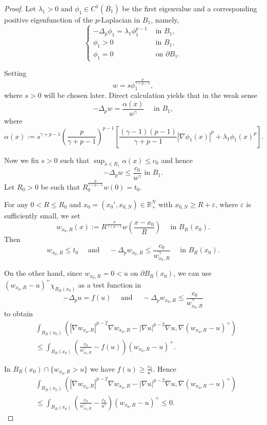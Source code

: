 \documentclass[10pt,a4paper]{amsart}
\begin{document}
	\begin{proof}
		Let $\lambda_1>0$ and $\phi_1 \in C^1(\overline{B_1})$ be the first eigenvalue and a corresponding positive eigenfunction of the $p$-Laplacian in $B_1$, namely,
		\[
		\begin{cases}
			-\Delta_p \phi_1 = \lambda_1 \phi_1^{p-1} & \text{ in } B_1,\\
			\phi_1 > 0 & \text{ in } B_1,\\
			\phi_1 = 0 & \text{ on } \partial B_1.
		\end{cases}
		\]
		
		Setting
		\[
		w = s \phi_1^\frac{p}{\gamma+p-1},
		\]
		where $s>0$ will be chosen later. Direct calculation yields that in the weak sense
		\[
		-\Delta_p w = \frac{\alpha(x)}{w^\gamma} \quad \text{ in } B_1,
		\]
		where
		\[
		\alpha(x) := s^{\gamma+p-1} \left(\frac{p}{\gamma+p-1}\right)^{p-1} \left[\frac{(\gamma-1)(p-1)}{\gamma+p-1}|\nabla\phi_1(x)|^p + \lambda_1\phi_1(x)^p\right].
		\]
		
		Now we fix $s>0$ such that $\sup_{x\in B_1}\alpha(x) \le c_0$ and hence
		\[
		-\Delta_p w \le \frac{c_0}{w^\gamma} \text{ in } B_1.
		\]
		Let $R_0>0$ be such that $R_0^\frac{p}{\gamma+p-1} w(0) = t_0$.
		
		For any $0<R\le R_0$ and $x_0 = (x_0', x_{0,N})\in\mathbb{R}^N_+$ with $x_{0,N} \ge R + \varepsilon$, where $\varepsilon$ is sufficiently small, we set
		\[
		w_{x_0,R}(x) := R^\frac{p}{\gamma+p-1}w\left(\frac{x-x_0}{R}\right) \quad\text{ in } B_R(x_0).
		\]
		Then
		\[
		w_{x_0,R} \le t_0 \quad\text{ and }\quad -\Delta_p w_{x_0,R} \le \frac{c_0}{w_{x_0,R}^\gamma} \quad\text{ in } B_R(x_0).
		\]
		
		On the other hand, since $w_{x_0,R}=0 < u$ on $\partial B_R(x_0)$, we can use $(w_{x_0,R}-u)^+ \chi_{B_R(x_0)}$ as a test function in
		\[
		-\Delta_p u = f(u)
		\quad\text{ and }\quad
		-\Delta_p w_{x_0,R} \le \frac{c_0}{w_{x_0,R}^\gamma}
		\]
		to obtain
		\begin{align*}
			&\int_{B_R(x_0)} (|\nabla w_{x_0,R}|^{p-2}\nabla w_{x_0,R} - |\nabla u|^{p-2}\nabla u, \nabla (w_{x_0,R}-u)^+) \\
			&\le \int_{B_R(x_0)} \left(\frac{c_0}{w_{x_0,R}^\gamma} - f(u)\right) (w_{x_0,R}-u)^+.
		\end{align*}
		
		In $B_R(x_0)\cap\{w_{x_0,R} > u\}$ we have $f(u) \ge \frac{c_0}{u^\gamma}$. Hence
		\begin{align*}
			&\int_{B_R(x_0)} (|\nabla w_{x_0,R}|^{p-2}\nabla w_{x_0,R} - |\nabla u|^{p-2}\nabla u, \nabla (w_{x_0,R}-u)^+) \\
			&\le \int_{B_R(x_0)} \left(\frac{c_0}{w_{x_0,R}^\gamma} - \frac{c_0}{u^\gamma}\right) (w_{x_0,R}-u)^+ \le 0.
		\end{align*}
		

\end{proof}
\end{document}
